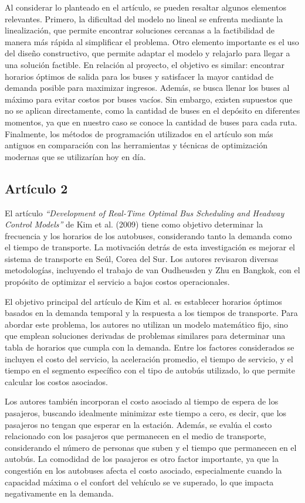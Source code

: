 \documentclass[preprint,11pt]{elsarticle}
\begin{document}
Al considerar lo planteado en el artículo, se pueden resaltar algunos elementos relevantes. Primero, la dificultad del modelo no lineal se enfrenta mediante la linealización, que permite encontrar soluciones cercanas a la factibilidad de manera más rápida al simplificar el problema. Otro elemento importante es el uso del diseño constructivo, que permite adaptar el modelo y relajarlo para llegar a una solución factible. En relación al proyecto, el objetivo es similar: encontrar horarios óptimos de salida para los buses y satisfacer la mayor cantidad de demanda posible para maximizar ingresos. Además, se busca llenar los buses al máximo para evitar costos por buses vacíos. Sin embargo, existen supuestos que no se aplican directamente, como la cantidad de buses en el depósito en diferentes momentos, ya que en nuestro caso se conoce la cantidad de buses para cada ruta. Finalmente, los métodos de programación utilizados en el artículo son más antiguos en comparación con las herramientas y técnicas de optimización modernas que se utilizarían hoy en día.

\subsection*{Artículo 2}

El artículo \textit{“Development of Real-Time Optimal Bus Scheduling and Headway Control Models”} de Kim et al. (2009) \parencite{kim2009} tiene como objetivo determinar la frecuencia y los horarios de los autobuses, considerando tanto la demanda como el tiempo de transporte. La motivación detrás de esta investigación es mejorar el sistema de transporte en Seúl, Corea del Sur. Los autores revisaron diversas metodologías, incluyendo el trabajo de van Oudheusden y Zhu en Bangkok, con el propósito de optimizar el servicio a bajos costos operacionales.

El objetivo principal del artículo de Kim et al. es establecer horarios óptimos basados en la demanda temporal y la respuesta a los tiempos de transporte. Para abordar este problema, los autores no utilizan un modelo matemático fijo, sino que emplean soluciones derivadas de problemas similares para determinar una tabla de horarios que cumpla con la demanda. Entre los factores considerados se incluyen el costo del servicio, la aceleración promedio, el tiempo de servicio, y el tiempo en el segmento específico con el tipo de autobús utilizado, lo que permite calcular los costos asociados.

Los autores también incorporan el costo asociado al tiempo de espera de los pasajeros, buscando idealmente minimizar este tiempo a cero, es decir, que los pasajeros no tengan que esperar en la estación. Además, se evalúa el costo relacionado con los pasajeros que permanecen en el medio de transporte, considerando el número de personas que suben y el tiempo que permanecen en el autobús. La comodidad de los pasajeros es otro factor importante, ya que la congestión en los autobuses afecta el costo asociado, especialmente cuando la capacidad máxima o el confort del vehículo se ve superado, lo que impacta negativamente en la demanda.
\end{document}
